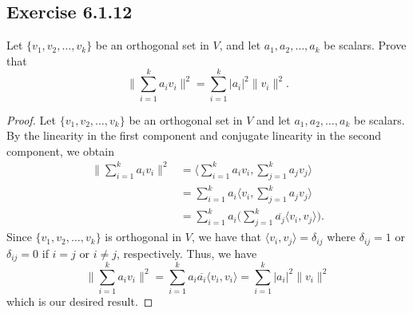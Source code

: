 \subsection*{Exercise 6.1.12}\label{Exercise 6.1.12} Let \( \{ {v}_{1}, {v}_{2}, \dots, {v}_{k} \}  \) be an orthogonal set in \( V  \), and let \( {a}_{1}, {a}_{2}, \dots, {a}_{k }  \) be scalars. Prove that
\[  \Big\| \sum_{ i=1 }^{ k  } {a}_{i} {v}_{i} \Big\|^{2} = \sum_{ i=1 }^{ k  } | {a}_{i} |^{2} \|{v}_{i}\|^{2}. \]
\begin{proof}
Let \( \{ {v}_{1}, {v}_{2}, \dots, {v}_{k } \}  \) be an orthogonal set in \( V  \) and let \( {a}_{1}, {a}_{2}, \dots, {a}_{k} \) be scalars. By the linearity in the first component and conjugate linearity in the second component, we obtain
\begin{align*}
    \Big\| \sum_{ i=1  }^{ k   } {a}_{i} {v}_{i} \Big\|^{2} &= \Big\langle \sum_{ i=1  }^{ k  } {a}_{i} {v}_{i}  ,  \sum_{ j=1  }^{ k  } {a}_{j} {v}_{j} \Big\rangle \\
                                                        &= \sum_{ i=1  }^{ k  } {a}_{i} \Big\langle  {v}_{i}  , \sum_{ j=1  }^{ k  } {a}_{j} {v}_{j}  \Big \rangle \\
                                                        &= \sum_{ i=1  }^{ k   } {a}_{i} \Big(  \sum_{ j=1  }^{ k  } \overline{{a}_{j}} \langle {v}_{i} ,  {v}_{j} \rangle   \Big).
\end{align*}
Since \( \{ {v}_{1}, {v}_{2}, \dots, {v}_{k } \}   \) is orthogonal in \( V  \), we have that \( \langle {v}_{i} , {v}_{j} \rangle = {\delta}_{ij} \) where \( {\delta}_{ij} = 1  \) or \( {\delta}_{ij} = 0   \) if \( i = j  \) or \( i \neq j  \), respectively. Thus, we have
\[  \Big\| \sum_{ i=1  }^{ k   } {a}_{i} {v}_{i} \Big\|^{2} = \sum_{ i=1  }^{ k  } {a}_{i} \overline{{a}_{i}} \langle {v}_{i}  , {v}_{i} \rangle = \sum_{ i=1  }^{ k  } | {a}_{i} | ^{2} \|{v}_{i}\|^{2}  \] which is our desired result.
\end{proof}

